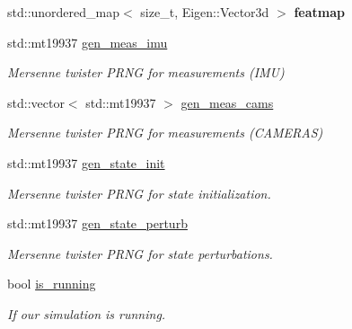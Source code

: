 \begin{DoxyCompactItemize}
std\+::unordered\+\_\+map$<$ size\+\_\+t, Eigen\+::\+Vector3d $>$ {\bfseries featmap}
\item 
\mbox{\label{classov__msckf_1_1Simulator_a5a21cc7b02ea84f58193093a3066cb52}} 
std\+::mt19937 \hyperlink{classov__msckf_1_1Simulator_a5a21cc7b02ea84f58193093a3066cb52}{gen\+\_\+meas\+\_\+imu}
\begin{DoxyCompactList}\small\item\em Mersenne twister P\+R\+NG for measurements (I\+MU) \end{DoxyCompactList}\item 
\mbox{\label{classov__msckf_1_1Simulator_a31b3202d5b9b277bc695970b4f1beeb9}} 
std\+::vector$<$ std\+::mt19937 $>$ \hyperlink{classov__msckf_1_1Simulator_a31b3202d5b9b277bc695970b4f1beeb9}{gen\+\_\+meas\+\_\+cams}
\begin{DoxyCompactList}\small\item\em Mersenne twister P\+R\+NG for measurements (C\+A\+M\+E\+R\+AS) \end{DoxyCompactList}\item 
\mbox{\label{classov__msckf_1_1Simulator_a4933a78e8768bdbc0bac91572f6b6d42}} 
std\+::mt19937 \hyperlink{classov__msckf_1_1Simulator_a4933a78e8768bdbc0bac91572f6b6d42}{gen\+\_\+state\+\_\+init}
\begin{DoxyCompactList}\small\item\em Mersenne twister P\+R\+NG for state initialization. \end{DoxyCompactList}\item 
\mbox{\label{classov__msckf_1_1Simulator_a7e6903d5e046acabb9c177ba3dd2dbff}} 
std\+::mt19937 \hyperlink{classov__msckf_1_1Simulator_a7e6903d5e046acabb9c177ba3dd2dbff}{gen\+\_\+state\+\_\+perturb}
\begin{DoxyCompactList}\small\item\em Mersenne twister P\+R\+NG for state perturbations. \end{DoxyCompactList}\item 
\mbox{\label{classov__msckf_1_1Simulator_a287cc404a867d549ec7c72613a884ee4}} 
bool \hyperlink{classov__msckf_1_1Simulator_a287cc404a867d549ec7c72613a884ee4}{is\+\_\+running}
\begin{DoxyCompactList}\small\item\em If our simulation is running. \end{DoxyCompactList}\item 

\end{DoxyCompactItemize}
